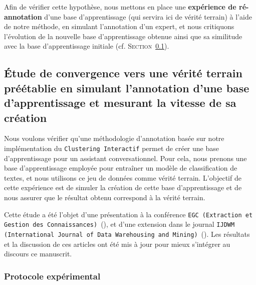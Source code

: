 	Afin de vérifier cette hypothèse, nous mettons en place une \textbf{expérience de ré-annotation} d'une base d'apprentissage (qui servira ici de vérité terrain) à l'aide de notre méthode, en simulant l'annotation d'un expert, et nous critiquons l'évolution de la nouvelle base d'apprentissage obtenue ainsi que sa similitude avec la base d'apprentissage initiale (cf. \textsc{Section~\ref{section:4.1.1-ETUDE-CONVERGENCE}}).
	
	
	\subsection{Étude de convergence vers une vérité terrain préétablie en simulant l'annotation d'une base d'apprentissage et mesurant la vitesse de sa création}
	\label{section:4.1.1-ETUDE-CONVERGENCE}
		
		Nous voulons vérifier qu'une méthodologie d'annotation basée sur notre implémentation du \texttt{Clustering Interactif} permet de créer une base d'apprentissage pour un assistant conversationnel.
		Pour cela, nous prenons une base d'apprentissage employée pour entraîner un modèle de classification de textes, et nous utilisons ce jeu de données comme vérité terrain.
		L'objectif de cette expérience est de simuler la création de cette base d'apprentissage et de nous assurer que le résultat obtenu correspond à la vérité terrain.
			
		\begin{leftBarInformation}
			Cette étude a été l'objet d'une présentation à la conférence \texttt{EGC (Extraction et Gestion des Connaissances)}~(\cite{schild-etal:2021:conception-iterative-semisupervisee}), et d'une extension dans le journal \texttt{IJDWM (International Journal of Data Warehousing and Mining)}~(\cite{schild-etal:2022:iterative-semisupervised-design}).
			Les résultats et la discussion de ces articles ont été mis à jour pour mieux s'intégrer au discours ce manuscrit.
		\end{leftBarInformation}

		\subsubsection{Protocole expérimental}
			
